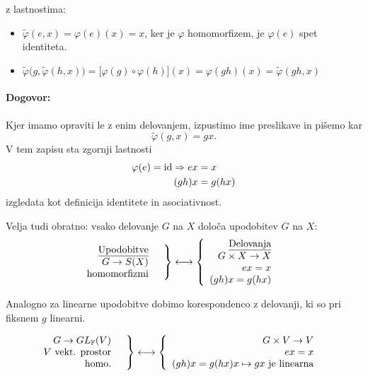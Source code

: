 \ni z lastnostima:
\begin{itemize}
	\item{$\tilde{\varphi}(e, x) = \varphi(e) (x) = x$, ker je $\varphi$ homomorfizem, je $\varphi(e)$ spet identiteta.}
	\item{$\tilde{\varphi}\big(g, \tilde{\varphi}(h,x)\big) = \big[\varphi(g) \circ \varphi(h)\big] (x) = \varphi (gh)(x) = \tilde{\varphi}(gh,x)$}
\end{itemize}

\paragraph{Dogovor:} Kjer imamo opraviti le z enim delovanjem, izpustimo ime preslikave in pi\v semo kar
\[
	\tilde{\varphi}(g,x) = gx.
\]
V tem zapisu sta zgornji lastnosti
\begin{align*}
	\varphi(e) = \operatorname{id} \Rightarrow ex &= x \\
		(gh)x &= g(hx)
\end{align*}
\ni izgledata kot definicija identitete in asociativnost.

\ni Velja tudi obratno: vsako delovanje $G$ na $X$ dolo\v ca upodobitev $G$ na $X$:
\begin{align*}
	\left.
	\begin{array}{rl}
		\text{\underline{Upodobitve}} & \\
		G \to S(X) & \\
		\text{homomorfizmi} &
	\end{array} \right\} \longleftrightarrow
	\left\{
	\begin{array}{rl}
		\text{\underline{Delovanja}} & \\
		G \times X \to X & \\
		ex = x &\\
		(gh)x = g(hx)
	\end{array}\right.
\end{align*}

\ni Analogno za linearne upodobitve dobimo korespondenco z delovanji, ki so pri fiksnem $g$ linearni.

\begin{align*}
	\left.
	\begin{array}{rl}
		G \to GL_{\mathbb{F}}(V) & \\
		\text{$V$ vekt. prostor} \\
		\text{homo.} &
	\end{array} \right\} \longleftrightarrow
	\left\{
	\begin{array}{rl}
		G \times V \to V& \\
		ex = x & \\
		(gh)x = g(hx)
		x \mapsto gx\ \text{je linearna}
	\end{array}\right.
\end{align*}

